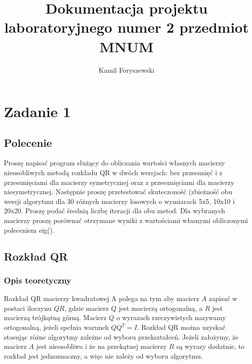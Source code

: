 \documentclass[a4paper, 11pt]{article}
\author{Kamil Foryszewski}
\title{Dokumentacja projektu laboratoryjnego numer 2 przedmiot MNUM}
\begin{document}

\maketitle
\tableofcontents

\section{Zadanie 1}

\subsection{Polecenie}
Proszę napisać program służący do obliczania wartości własnych macierzy nieosobliwych metodą rozkładu QR w dwóch wersjach: bez przesunięć i z przesunięciami dla macierzy symetrycznej oraz z przesunięciami dla macierzy niesymetrycznej. Następnie proszę przetestować skuteczoność (zbieżność obu wersji algorytmu dla 30 różnych macierzy losowych o wymiarach 5x5, 10x10 i 20x20. Proszę podać średnią liczbę iteracji dla obu metod. Dla wybranych macierzy proszę porównać otrzymane wyniki z wartościami własnymi obliczonymi poleceniem eig(). 

\subsection{Rozkład QR}
\subsubsection{Opis teoretyczny}
Rozkład QR macierzy kwadratowej A polega na tym aby macierz $A$ zapisać w postaci iloczynu $QR$, gdzie macierz $Q$ jest macierzą ortogonalną, a $R$ jest macierzą trójkątną górną. Macierz $Q$ o wyrazach rzeczywistych nazywamy ortogonalną, jeżeli spełnia warunek $QQ^T = I$. Rozkład QR można uzyskać stosując różne algorytmy zależne od wyboru przekształceń. Jeżeli założymy, że macierz $A$ jest nieosobliwa i że na przekątnej macierzy $R$ są wyrazy dodatnie, to rozkład jest jednoznaczny, a  więc  nie  zależy  od  wyboru  algorytmu.
\end{document}

